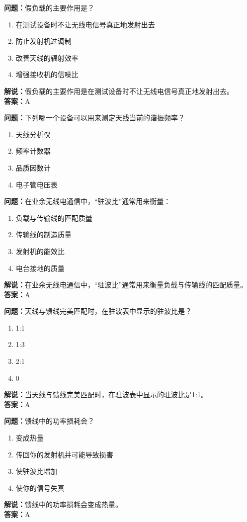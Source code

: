 \documentclass[UTF8]{ctexbook}
\begin{document}
\textbf{问题：}假负载的主要作用是？
\begin{enumerate}[label=\Alph*), leftmargin=3em]
  \item 在测试设备时不让无线电信号真正地发射出去
  \item 防止发射机过调制
  \item 改善天线的辐射效率
  \item 增强接收机的信噪比
\end{enumerate}
\textbf{解说：}假负载的主要作用是在测试设备时不让无线电信号真正地发射出去。\\
\textbf{答案：}A

\textbf{问题：}下列哪一个设备可以用来测定天线当前的谐振频率？
\begin{enumerate}[label=\Alph*), leftmargin=3em]
  \item 天线分析仪
  \item 频率计数器
  \item 品质因数计
  \item 电子管电压表
\end{enumerate}

\textbf{问题：}在业余无线电通信中，“驻波比”通常用来衡量：
\begin{enumerate}[label=\Alph*), leftmargin=3em]
  \item 负载与传输线的匹配质量
  \item 传输线的制造质量
  \item 发射机的能效比
  \item 电台接地的质量
\end{enumerate}
\textbf{解说：}在业余无线电通信中，“驻波比”通常用来衡量负载与传输线的匹配质量。\\
\textbf{答案：}A

\textbf{问题：}天线与馈线完美匹配时，在驻波表中显示的驻波比是？
\begin{enumerate}[label=\Alph*), leftmargin=3em]
  \item 1:1
  \item 1:3
  \item 2:1
  \item 0
\end{enumerate}
\textbf{解说：}当天线与馈线完美匹配时，在驻波表中显示的驻波比是1:1。\\
\textbf{答案：}A

\textbf{问题：}馈线中的功率损耗会？
\begin{enumerate}[label=\Alph*), leftmargin=3em]
  \item 变成热量
  \item 传回你的发射机并可能导致损害
  \item 使驻波比增加
  \item 使你的信号失真
\end{enumerate}
\textbf{解说：}馈线中的功率损耗会变成热量。\\
\textbf{答案：}A
\end{document}

